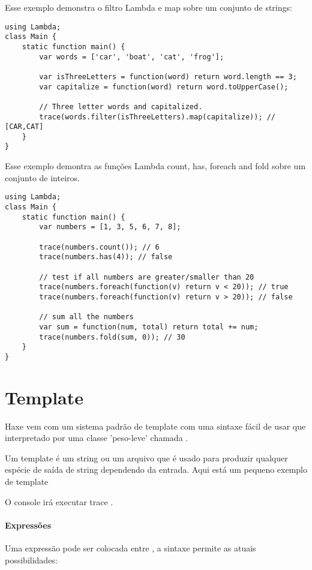 {Esse exemplo demonstra o filtro Lambda e map sobre um conjunto de strings:

\begin{lstlisting}
using Lambda;
class Main {
    static function main() {
        var words = ['car', 'boat', 'cat', 'frog'];

		var isThreeLetters = function(word) return word.length == 3;
		var capitalize = function(word) return word.toUpperCase();
		
		// Three letter words and capitalized. 
		trace(words.filter(isThreeLetters).map(capitalize)); // [CAR,CAT]
    }
}
\end{lstlisting} 

Esse exemplo demontra as funções Lambda count, has, foreach and fold sobre um conjunto de inteiros.

\begin{lstlisting}
using Lambda;
class Main {
    static function main() {
        var numbers = [1, 3, 5, 6, 7, 8];
		
		trace(numbers.count()); // 6
		trace(numbers.has(4)); // false
		
        // test if all numbers are greater/smaller than 20
		trace(numbers.foreach(function(v) return v < 20)); // true
        trace(numbers.foreach(function(v) return v > 20)); // false
		
        // sum all the numbers
		var sum = function(num, total) return total += num;
		trace(numbers.fold(sum, 0)); // 30
    }
}
\end{lstlisting} 

\section{Template}
\label{std-template}

Haxe vem com um sistema padrão de template com uma sintaxe fácil de usar que interpretado por uma classe 'peso-leve' chamada .

Um template é um string ou um arquivo que é usado para produzir qualquer espécie de saída de string dependendo da entrada. Aqui está um pequeno exemplo de template 


O console irá executar trace .

\paragraph{Expressões}
Uma expressão pode ser colocada entre \ic{::}, a sintaxe permite as atuais possibilidades:

}
